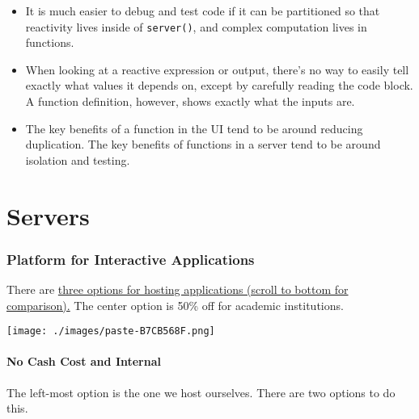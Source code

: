 \documentclass[
  letterpaper,
  DIV=11,
  numbers=noendperiod,
  oneside]{scrreprt}
\begin{document}
\begin{itemize}
\begin{itemize}
    \begin{itemize}
    \item
      It is much easier to debug and test code if it can be partitioned
      so that reactivity lives inside of \texttt{server()}, and complex
      computation lives in functions.
    \item
      When looking at a reactive expression or output, there's no way to
      easily tell exactly what values it depends on, except by carefully
      reading the code block. A function definition, however, shows
      exactly what the inputs are.
    \item
      The key benefits of a function in the UI tend to be around
      reducing duplication. The key benefits of functions in a server
      tend to be around isolation and testing.
    \end{itemize}
  \end{itemize}
\end{itemize}


\hypertarget{servers}{%
\chapter{Servers}\label{servers}}

\hypertarget{platform-for-interactive-applications}{%
\subsection{Platform for Interactive
Applications}\label{platform-for-interactive-applications}}

There are
\href{https://posit.co/products/open-source/shinyserver/?_ga=2.218758425.1435543973.1677605377-1975567833.1670879814}{three
options for hosting applications (scroll to bottom for comparison).} The
center option is 50\% off for academic institutions.

\texttt{[image: ./images/paste-B7CB568F.png]}

\hypertarget{no-cash-cost-and-internal}{%
\subsubsection{No Cash Cost and
Internal}\label{no-cash-cost-and-internal}}

The left-most option is the one we host ourselves. There are two options
to do this.
\end{document}
